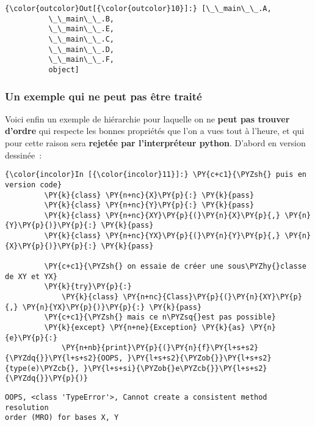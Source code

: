 \begin{Verbatim}[commandchars=\\\{\},frame=single,framerule=0.3mm,rulecolor=\color{cellframecolor}]
{\color{outcolor}Out[{\color{outcolor}10}]:} [\_\_main\_\_.A,
          \_\_main\_\_.B,
          \_\_main\_\_.E,
          \_\_main\_\_.C,
          \_\_main\_\_.D,
          \_\_main\_\_.F,
          object]
\end{Verbatim}
            
    \hypertarget{un-exemple-qui-ne-peut-pas-uxeatre-traituxe9}{%
\subsubsection{Un exemple qui ne peut pas être
traité}\label{un-exemple-qui-ne-peut-pas-uxeatre-traituxe9}}

    Voici enfin un exemple de hiérarchie pour laquelle on ne \textbf{peut
pas trouver d'ordre} qui respecte les bonnes propriétés que l'on a vues
tout à l'heure, et qui pour cette raison sera \textbf{rejetée par
l'interpréteur python}. D'abord en version dessinée~:

    \begin{Verbatim}[commandchars=\\\{\},frame=single,framerule=0.3mm,rulecolor=\color{cellframecolor}]
{\color{incolor}In [{\color{incolor}11}]:} \PY{c+c1}{\PYZsh{} puis en version code}
         \PY{k}{class} \PY{n+nc}{X}\PY{p}{:} \PY{k}{pass}
         \PY{k}{class} \PY{n+nc}{Y}\PY{p}{:} \PY{k}{pass}
         \PY{k}{class} \PY{n+nc}{XY}\PY{p}{(}\PY{n}{X}\PY{p}{,} \PY{n}{Y}\PY{p}{)}\PY{p}{:} \PY{k}{pass}
         \PY{k}{class} \PY{n+nc}{YX}\PY{p}{(}\PY{n}{Y}\PY{p}{,} \PY{n}{X}\PY{p}{)}\PY{p}{:} \PY{k}{pass}
         
         \PY{c+c1}{\PYZsh{} on essaie de créer une sous\PYZhy{}classe de XY et YX}
         \PY{k}{try}\PY{p}{:}
             \PY{k}{class} \PY{n+nc}{Class}\PY{p}{(}\PY{n}{XY}\PY{p}{,} \PY{n}{YX}\PY{p}{)}\PY{p}{:} \PY{k}{pass} 
         \PY{c+c1}{\PYZsh{} mais ce n\PYZsq{}est pas possible}
         \PY{k}{except} \PY{n+ne}{Exception} \PY{k}{as} \PY{n}{e}\PY{p}{:}
             \PY{n+nb}{print}\PY{p}{(}\PY{n}{f}\PY{l+s+s2}{\PYZdq{}}\PY{l+s+s2}{OOPS, }\PY{l+s+s2}{\PYZob{}}\PY{l+s+s2}{type(e)\PYZcb{}, }\PY{l+s+si}{\PYZob{}e\PYZcb{}}\PY{l+s+s2}{\PYZdq{}}\PY{p}{)}
\end{Verbatim}


    \begin{Verbatim}[commandchars=\\\{\},frame=single,framerule=0.3mm,rulecolor=\color{cellframecolor}]
OOPS, <class 'TypeError'>, Cannot create a consistent method resolution
order (MRO) for bases X, Y
\end{Verbatim}

